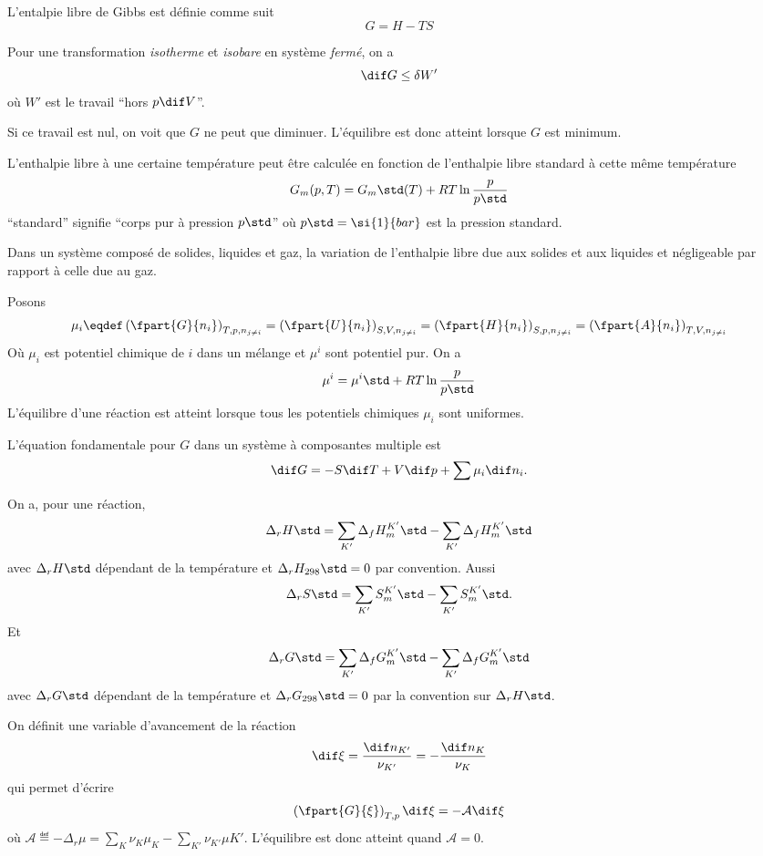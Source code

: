 L'entalpie libre de Gibbs est définie comme suit
\[ G = H - TS \]

Pour une transformation \emph{isotherme} et \emph{isobare}
en système \emph{fermé}, on a
\begin{equation}
  \label{eq:dGdW}
  \dif G \leq \delta W'
\end{equation}
où $W'$ est le travail ``hors $p\dif V$''.

Si ce travail est nul, on voit que $G$ ne peut que diminuer.
L'équilibre est donc atteint lorsque $G$ est minimum.

L'enthalpie libre à une certaine température peut être calculée
en fonction de l'enthalpie libre standard à cette même température
\[ G_m(p, T) = G_m\std(T) + RT \ln \frac{p}{p\std} \]
``standard'' signifie ``corps pur à pression $p\std$'' où
$p\std = \si{1}{bar}$ est la pression standard.

Dans un système composé de solides, liquides et gaz, la variation
de l'enthalpie libre due aux solides et aux liquides et négligeable par
rapport à celle due au gaz.

Posons
\[ \mu_i \eqdef \left(\fpart{G}{n_i}\right)_{T,p,n_{j\neq i}} =
\left(\fpart{U}{n_i}\right)_{S,V,n_{j\neq i}} =
\left(\fpart{H}{n_i}\right)_{S,p,n_{j\neq i}} =
\left(\fpart{A}{n_i}\right)_{T,V,n_{j\neq i}} \]
Où $\mu_i$ est potentiel chimique de $i$ dans un mélange
et $\mu^i$ sont potentiel pur.
On a
\[ \mu^i = {\mu^i}\std + RT \ln\frac{p}{p\std} \]
L'équilibre d'une réaction est atteint lorsque tous les potentiels
chimiques $\mu_i$ sont uniformes.

L'équation fondamentale pour $G$ dans un système à composantes
multiple est
\[ \dif G = -S\dif T + V\dif p + \sum \mu_i \dif n_i. \]

On a, pour une réaction,
\[ \Delta_r H\std =
\sum_{K'}\Delta_f{H_m^{K'}}\std - \sum_{K'}\Delta_f{H_m^{K'}}\std \]
avec $\Delta_r H\std$ dépendant de la température et
$\Delta_r H_{298}\std = 0$ par convention.
Aussi
\[ \Delta_r S\std =
\sum_{K'}{S_m^{K'}}\std - \sum_{K'}{S_m^{K'}}\std. \]
Et
\[ \Delta_r G\std =
\sum_{K'}\Delta_f{G_m^{K'}}\std - \sum_{K'}\Delta_f{G_m^{K'}}\std \]
avec $\Delta_r G\std$ dépendant de la température et
$\Delta_r G_{298}\std = 0$ par la convention sur $\Delta_r H\std$.

On définit une variable d'avancement de la réaction
\[ \dif \xi = \frac{\dif n_{K'}}{\nu_{K'}} = -\frac{\dif n_K}{\nu_K} \]
qui permet d'écrire
\[ \left(\fpart{G}{\xi}\right)_{T,p}\dif \xi = -\mathcal{A}\dif \xi \]
où $\mathcal{A} \eqdef
-\Delta_r \mu = \sum_K \nu_K\mu_K - \sum_{K'}\nu_{K'}\mu{K'}$.
L'équilibre est donc atteint quand $\mathcal{A} = 0$.


